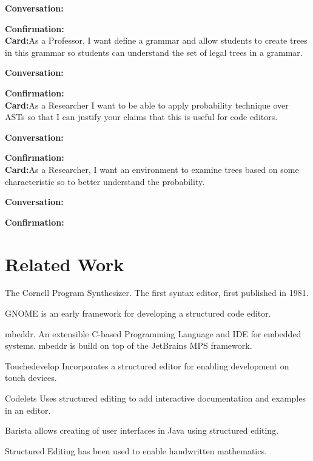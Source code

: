 \documentclass{sig-alternate-05-2015}
\begin{document}
\textbf{Conversation:} 

\textbf{Confirmation:}\\


\textbf{Card:}As a Professor, I want define a grammar and allow students to create trees in this grammar so students can understand the set of legal trees in a grammar.

\textbf{Conversation:} 

\textbf{Confirmation:}\\




\textbf{Card:}As a Researcher I want to be able to apply probability technique over ASTs so that I can justify your claims that this is useful for code editors.

\textbf{Conversation:}

\textbf{Confirmation:}\\


\textbf{Card:}As a Researcher, I want an environment to examine trees based on some characteristic so to better understand the probability.

\textbf{Conversation:}

\textbf{Confirmation:}\\




\section{Related Work}

The Cornell Program Synthesizer.\cite{teitelbaum_cornell_1981}  The first syntax editor, first published in 1981.

GNOME\cite{garlan_gnome:_1984} is an early framework for developing a structured code editor.

mbeddr. \cite{voelter_mbeddr:_2012} An extensible C-based Programming Language and IDE for embedded systems.
mbeddr is build on top of the JetBrains MPS framework.  

Touchedevelop \cite{tillmann_touchdevelop:_2011} Incorporates a structured editor for enabling development on touch devices.

Codelets \cite{oney_codelets:_2012} Uses structured editing to add interactive documentation and examples in an editor.

Barista\cite{ko_barista:_2006} allows creating of user interfaces in Java using structured editing.

Structured Editing has been used to enable handwritten mathematics. \cite{mendes_structure_2014}
\end{document}
